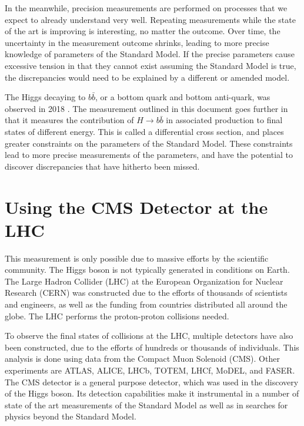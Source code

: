 In the meanwhile, precision measurements are performed on
processes that we expect to already understand very well.
Repeating measurements while the state of the art is improving is interesting,
no matter the outcome.
Over time, the uncertainty in the measurement outcome shrinks,
leading to more precise knowledge of parameters of the Standard Model.
If the precise parameters cause excessive tension in that they cannot exist
assuming the Standard Model is true,
the discrepancies would need to be explained by a different or amended model.

The Higgs decaying to $b\bar{b}$, or a bottom quark and bottom anti-quark,
was observed in 2018 \cite{obs-18, Aaboud_2018}.
The measurement outlined in this document goes further in that
it measures the contribution of $H \rightarrow b\bar{b}$ in associated production
to final states of different energy.
This is called a differential cross section,
and places greater constraints on the parameters of the Standard Model.
These constraints lead to more precise measurements of the parameters,
and have the potential to discover discrepancies that have hitherto been missed.

\section{Using the CMS Detector at the LHC}

This measurement is only possible due to massive efforts by the scientific community.
The Higgs boson is not typically generated in conditions on Earth.
The Large Hadron Collider (LHC) at the European Organization for Nuclear Research (CERN)
was constructed due to the efforts of thousands of scientists and engineers,
as well as the funding from countries distributed all around the globe.
The LHC performs the proton-proton collisions needed.

To observe the final states of collisions at the LHC,
multiple detectors have also been constructed,
due to the efforts of hundreds or thousands of individuals.
This analysis is done using data from the Compact Muon Solenoid (CMS).
Other experiments are ATLAS, ALICE, LHCb, TOTEM, LHCf, MoDEL, and FASER.
The CMS detector is a general purpose detector,
which was used in the discovery of the Higgs boson.
Its detection capabilities make it instrumental in a number of state of the art
measurements of the Standard Model as well as in searches for
physics beyond the Standard Model.
